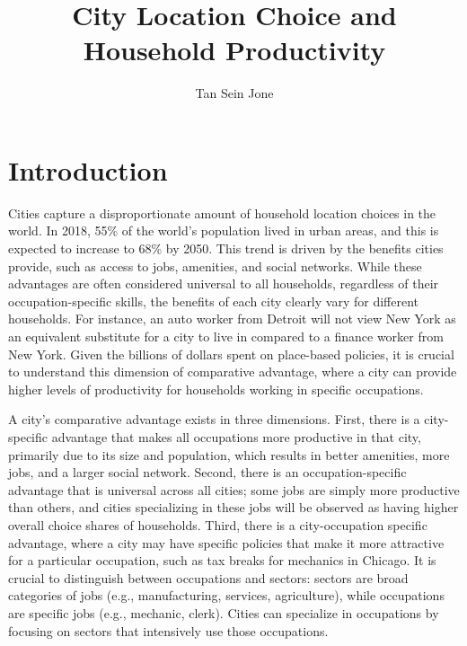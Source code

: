 \documentclass[10pt]{article}
\title{City Location Choice and Household Productivity}
\author{Tan Sein Jone}
\date{}
\begin{document}
\doublespacing
\maketitle

\section{Introduction}

Cities capture a disproportionate amount of household location choices in the world. In 2018, 55\% of the world's population lived in urban areas, and this is expected to increase to 68\% by 2050. This trend is driven by the benefits cities provide, such as access to jobs, amenities, and social networks. While these advantages are often considered universal to all households, regardless of their occupation-specific skills, the benefits of each city clearly vary for different households. For instance, an auto worker from Detroit will not view New York as an equivalent substitute for a city to live in compared to a finance worker from New York. Given the billions of dollars spent on place-based policies, it is crucial to understand this dimension of comparative advantage, where a city can provide higher levels of productivity for households working in specific occupations.

A city's comparative advantage exists in three dimensions. First, there is a city-specific advantage that makes all occupations more productive in that city, primarily due to its size and population, which results in better amenities, more jobs, and a larger social network. Second, there is an occupation-specific advantage that is universal across all cities; some jobs are simply more productive than others, and cities specializing in these jobs will be observed as having higher overall choice shares of households. Third, there is a city-occupation specific advantage, where a city may have specific policies that make it more attractive for a particular occupation, such as tax breaks for mechanics in Chicago. It is crucial to distinguish between occupations and sectors: sectors are broad categories of jobs (e.g., manufacturing, services, agriculture), while occupations are specific jobs (e.g., mechanic, clerk). Cities can specialize in occupations by focusing on sectors that intensively use those occupations.
\end{document}
